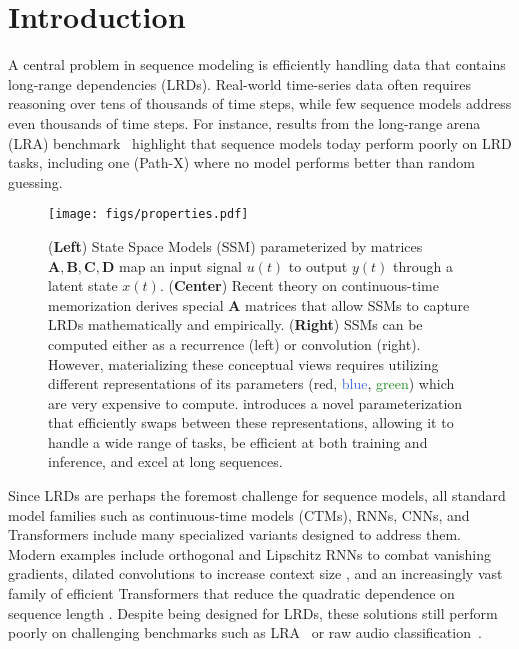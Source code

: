 

\section{Introduction}
\label{sec:intro}


A central problem in sequence modeling is efficiently handling data that contains long-range dependencies (LRDs).
Real-world time-series data often requires reasoning over tens of thousands of time steps, while few sequence models address even thousands of time steps.
For instance, results from the long-range arena (LRA) benchmark~\citep{tay2021long} highlight that sequence models today perform poorly on LRD tasks,
including one (Path-X) where no model performs better than random guessing.










\begin{figure}[!t]
    \centering
    \texttt{[image: figs/properties.pdf]}
    \caption{
      (\textbf{Left}) State Space Models (SSM) parameterized by matrices \( \bm{A}, \bm{B}, \bm{C}, \bm{D} \) map an input signal \( u(t) \) to output \( y(t) \) through a latent state \( x(t) \).
      (\textbf{Center}) Recent theory on continuous-time memorization derives special \( \bm{A} \) matrices that allow SSMs to capture LRDs mathematically and empirically.
      (\textbf{Right}) SSMs can be computed either as a recurrence (left) or convolution (right).
      However, materializing these conceptual views requires utilizing different representations of its parameters (\textcolor{BrickRed}{red}, \textcolor{RoyalBlue}{blue}, \textcolor{ForestGreen}{green}) which are very expensive to compute.
      \methodabbrv{} introduces a novel parameterization that efficiently swaps between these representations, allowing it to handle a wide range of tasks, be efficient at both training and inference, and excel at long sequences.
    }
\label{fig:properties}
\end{figure}


Since LRDs are perhaps {the} foremost challenge for sequence models, all standard model families such as continuous-time models (CTMs), RNNs, CNNs, and Transformers include many specialized variants designed to address them.
Modern examples include orthogonal and Lipschitz RNNs \citep{arjovsky2016unitary,erichson2021lipschitz} to combat vanishing gradients, dilated convolutions to increase context size \citep{bai2018empirical,oord2016wavenet}, and an increasingly vast family of efficient Transformers that reduce the quadratic dependence on sequence length \citep{katharopoulos2020transformers,choromanski2020rethinking}.
Despite being designed for LRDs, these solutions still perform poorly on challenging benchmarks such as LRA~\citep{tay2021long} or raw audio classification~\citep{gu2021lssl}.


